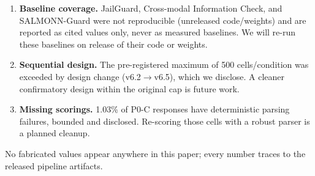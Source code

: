 \begin{enumerate}[label=(\roman*)]
  \item \textbf{Baseline coverage.} JailGuard, Cross-modal Information Check,
        and SALMONN-Guard were not reproducible (unreleased code/weights) and
        are reported as cited values only, never as measured baselines. We will
        re-run these baselines on release of their code or weights.
  \item \textbf{Sequential design.} The pre-registered maximum of 500
        cells\slash condition was exceeded by design change (v6.2$\rightarrow$v6.5),
        which we disclose. A cleaner confirmatory design within the original
        cap is future work.
  \item \textbf{Missing scorings.} 1.03\% of P0-C responses have deterministic
        parsing failures, bounded and disclosed. Re-scoring those cells with a
        robust parser is a planned cleanup.
\end{enumerate}

No fabricated values appear anywhere in this paper; every number traces to the
released pipeline artifacts.
